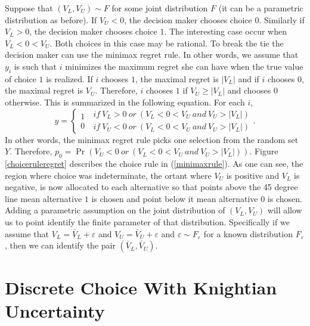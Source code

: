 \documentclass[reqno]{article}
\begin{document}
Suppose that $\left( V_{L},V_{U}\right) \sim F$ for some joint distribution $%
F$ (it can be a parametric distribution as before). If $V_{U}<0$, the
decision maker chooses choice $0.$ Similarly if $V_{L}>0$, the decision
maker chooses choice $1$. The interesting case occur when $V_{L}<0<V_{U}$.
Both choices in this case may be rational. To break the tie the decision
maker can use the minimax regret rule. In other words, we assume that $y_{i}$
is such that $i$ minimizes the maximum regret she can have when the true
value of choice $1$ is realized. If $i$ chooses $1$, the maximal regret is $%
\left\vert V_{L}\right\vert $ and if $i$ chooses $0$, the maximal regret is $%
V_{U}$. Therefore, $i$ chooses $1$ if $V_{U}\geq \left\vert V_{L}\right\vert 
$ and chooses $0$ otherwise. This is summarized in the following equation.
For each $i$,%
\begin{equation}
y=\left\{ 
\begin{array}{c}
1 \\ 
0%
\end{array}%
\ 
\begin{array}{c}
if\ V_{L}>0\ or\ (V_{L}<0<V_{U}\ and\ V_{U}>|V_{L}|) \\ 
if\ V_{U}<0\ or\ (V_{L}<0<V_{U}\ and\ V_{U}>|V_{L}|)%
\end{array}%
\right. .  \label{minimaxrule}
\end{equation}%
In other words, the minimax regret rule picks one selection from the random
set $Y$. Therefore, $p_{0}=\Pr \left( V_{U}<0\ or\ (V_{L}<0<V_{U}\ and\
V_{U}>|V_{L}|)\right) $. Figure \ref{choiceruleregret} describes the choice
rule in (\ref{minimaxrule}). As one can see, the region where choice was
indeterminate, the ortant where $V_{U}$ is positive and $V_{L}$ is negative,
is now allocated to each alternative so that points above the 45 degree line
mean alternative $1$ is chosen and point below it mean alternative $0$ is
chosen. Adding a parametric assumption on the joint distribution of $\left(
V_{L},V_{U}\right) $ will allow us to point identify the finite parameter of
that distribution. Specifically if we assume that $V_{L}=\bar{V}%
_{L}+\varepsilon $ and $V_{U}=\bar{V}_{U}+\varepsilon $ and $\varepsilon
\sim F_{\varepsilon }$ for a known distribution $F_{\varepsilon }$, then we
can identify the pair $\left( \bar{V}_{L},\bar{V}_{U}\right) $.


\section{Discrete Choice With Knightian Uncertainty}
\end{document}
